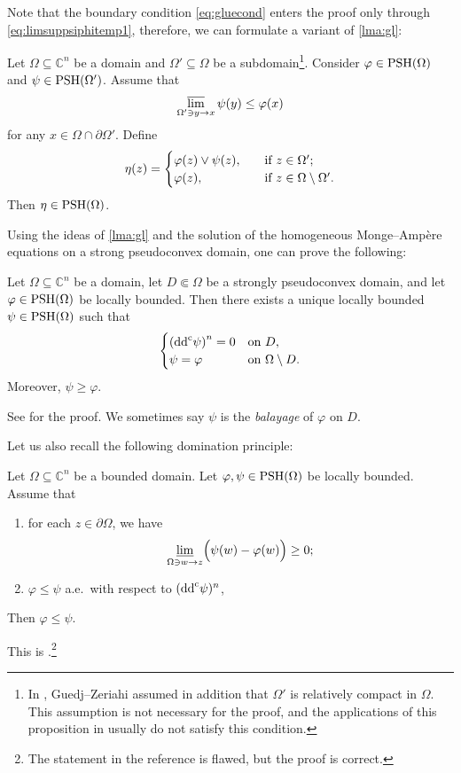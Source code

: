 Note that the boundary condition \eqref{eq:gluecond} enters the proof only through \eqref{eq:limsuppsiphitemp1}, therefore, we can formulate a variant of \cref{lma:gl}:
\begin{corollary}\label{cor:glbdry}
    Let $\Omega\subseteq \mathbb{C}^n$ be a domain and $\Omega'\subseteq \Omega$ be a subdomain\footnote{In \cite[Proposition~1.30]{GZ17}, Guedj--Zeriahi assumed in addition that $\Omega'$ is relatively compact in $\Omega$. This assumption is not necessary for the proof, and the applications of this proposition in \cite{GZ17} usually do not satisfy this condition.}. Consider $\varphi\in \mathrm{PSH}(\Omega)$ and $\psi\in \mathrm{PSH}(\Omega')$. Assume that
    \[
        \varlimsup_{\Omega'\ni y\to x}\psi(y)\leq \varphi(x)
    \]
    for any $x\in \Omega\cap\partial\Omega'$. Define
    \[
    \eta(z)=\begin{cases}
        \varphi(z)\lor \psi(z),&\quad \textup{if }z\in \Omega';\\
        \varphi(z),&\quad \textup{if }z\in \Omega\setminus\Omega'.
    \end{cases}
    \]
    Then $\eta\in \mathrm{PSH}(\Omega)$.
\end{corollary}


Using the ideas of \cref{lma:gl} and the solution of the homogeneous Monge--Ampère equations on a strong pseudoconvex domain, one can prove the following:
\begin{proposition}\label{prop:BT_balayage}
Let $\Omega \subseteq \mathbb{C}^n$ be a domain, let $D \Subset \Omega$ be a strongly pseudoconvex domain, and let $\varphi \in \mathrm{PSH}(\Omega)$ be locally bounded.
Then there exists a unique locally bounded $\psi\in \mathrm{PSH}(\Omega)$
such that
\[
\begin{cases}
\left(\mathrm{dd}^{\mathrm{c}}\psi\right)^n = 0& \textup{on } D,\\
\psi = \varphi & \textup{on } \Omega\setminus D.
\end{cases}
\]
Moreover, $\psi\geq \varphi$.
\end{proposition}
See \cite[Proposition~9.1]{BT82} for the proof. We sometimes say $\psi$ is the \emph{balayage} of $\varphi$ on $D$.

Let us also recall the following domination principle:
\begin{proposition}\label{prop:dom_prin_loc}
    Let $\Omega\subseteq \mathbb{C}^n$ be a bounded domain.
    Let $\varphi,\psi\in \mathrm{PSH}(\Omega)$ be locally bounded. Assume that
    \begin{enumerate}
        \item\label{itm:prop:dom_prin_loc:1} for each $z\in \partial \Omega$, we have
            \[
                \varliminf_{\Omega\ni w\to z} \Bigl(\psi(w)-\varphi(w)\Bigr)\geq 0;
            \]
        \item\label{itm:prop:dom_prin_loc:2} $\varphi\leq \psi$ a.e.\ with respect to $(\mathrm{dd}^{\mathrm{c}} \psi)^n$,
    \end{enumerate}
    Then $\varphi\leq \psi$.
\end{proposition}
This is \cite[Corollary~3.31]{GZ17}.\footnote{The statement in the reference is flawed, but the proof is correct.}


